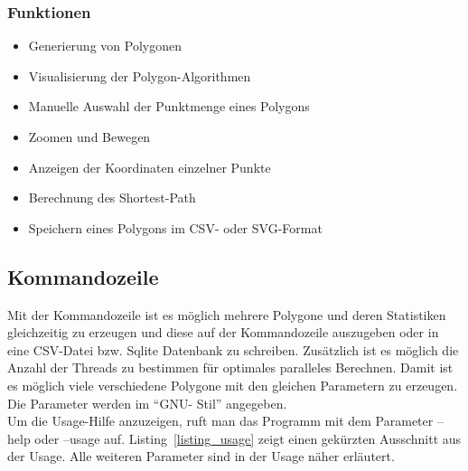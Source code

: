     \subsubsection{Funktionen}

      \begin{itemize}
        \item Generierung von Polygonen
        \item Visualisierung der Polygon-Algorithmen
        \item Manuelle Auswahl der Punktmenge eines Polygons
        \item Zoomen und Bewegen
        \item Anzeigen der Koordinaten einzelner Punkte
        \item Berechnung des Shortest-Path
        \item Speichern eines Polygons im CSV- oder SVG-Format
      \end{itemize}

  \subsection{Kommandozeile}

    Mit der Kommandozeile ist es möglich mehrere Polygone und deren Statistiken
    gleichzeitig zu erzeugen und diese auf der Kommandozeile auszugeben oder in
    eine CSV-Datei bzw. Sqlite Datenbank zu schreiben.
    Zusätzlich ist es möglich die Anzahl der Threads zu bestimmen für optimales
    paralleles Berechnen. Damit ist es möglich viele verschiedene Polygone mit
    den gleichen Parametern zu erzeugen. Die Parameter werden im \enquote{GNU-
    Stil} angegeben.\\ Um die Usage-Hilfe anzuzeigen, ruft man das Programm mit
    dem Parameter --help oder --usage auf. Listing~\ref{listing_usage} zeigt
    einen gekürzten Ausschnitt aus der Usage. Alle weiteren Parameter sind in
    der Usage näher erläutert.


